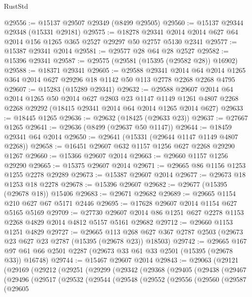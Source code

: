 \begin{lexlean}{RustStd}
\begin{coremodule}
@29556 := @15137 @29507 @29349 (@8499 @29505)
@29560 := @15137 @29344 @29348 (@15331 @29181)
@29575 := @18278
    @29341
    @2014
    @2014
    @627
    @64
    @2014
    @156
    @1265
    @365
    @2527
    @29297
    @50
    @2757
    @5130
    @2341
@29577 := @15387 @29341 @2014
@29581 := @29577 @28 @64 @28 @2527
@29582 := @15396 @29341
@29587 := @29575 (@29581 (@15395 (@29582 @28)) @16902)
@29588 := @18371 @29341
@29605 := @29588
    @29341
    @2014
    @64
    @2014
    @1265
    @364
    @2014
    @627
    @29296
    @18
    @1142
    @50
    @113
    @2778
    @2268
    @2268
    @4795
@29607 := @15283 (@15289 @29341)
@29632 := @29588
    @29607
    @2014
    @64
    @2014
    @1265
    @50
    @2014
    @627
    @2803
    @23
    @1147
    @1149
    @1261
    @4807
    @2268
    @2268
    @29292
    (@18415 @29341 @2014 @64 @2014 @1265 @2014 @627)
@29633 := @18445 @1265
@29636 := @29632 (@18425 (@29633 @23))
@29637 := @27667 @1265
@29641 := @29636 (@8499 (@29637 @50 @1147))
@29644 := @18459 @29341 @64 @2014
@29650 := @29641 (@15331 (@29644 @1147 @1149 @4807 @2268))
@29658 := @16451 @29607 @632 @1157 @1256 @627 @2268 @29290 @1267
@29660 := @15366 @29607 @2014
@29663 := @29660 @1157 @1256 @29290
@29665 := @15375 @29607 @2014
@29671 := @29665 @86 @1156 @1253 @1255 @2278 @29289
@29673 := @15387 @29607 @2014
@29677 := @29673 @18 @1253 @18 @2278
@29678 := @15396 @29607
@29682 := @29677 (@15395 (@29678 @18)) @15406
@29683 := @29671 @29682
@29689 := @29665 @1154 @210 @627 @67 @5171 @2446
@29695 := @17628 @29607 @2014 @1154 @627 @5165 @5169
@29709 := @27730 @29607 @2014 @86 @1251 @627 @2278 @1153 @2268 @4829 @2014 @4812 @5157 @5161 @29682
@29712 := @29660 @1153 @1251 @4829
@29727 := @29665
    @113
    @268
    @627
    @367
    @2787
    @2503
    (@29673 @23 @627 @23 @2787 (@15395 (@29678 @23)) @18503)
@29742 := @29665
    @167
    @97
    @61
    @66
    @2501
    @2287
    (@29673 @33 @61 @33 @2501 (@15395 (@29678 @33)) @16748)
@29744 := @15467 @29607 @2014
@29843 := @29063
    (@29121
      (@29169
        (@29212
          (@29251
            (@29299
              (@29342
                (@29368
                  (@29405
                    (@29438
                      (@29467
                        (@29496
                          (@29517
                            (@29532
                              (@29544
                                (@29548
                                  (@29552
                                    (@29556
                                      (@29560
                                        (@29587
                                          (@29605

\end{coremodule}
\end{lexlean}
